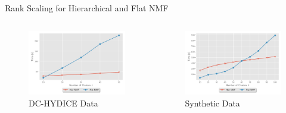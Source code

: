 \documentclass{beamer}
\newcommand{\hyper}{DC-HYDICE}
\begin{document}
\begin{frame}{Rank Scaling for Hierarchical and Flat NMF}
    \centering
    \begin{columns}
        \begin{column}{0.5\textwidth}
            \begin{figure}
            \includegraphics[width=\textwidth]{../plots/dc_rankscaling.pdf}
            \caption{\hyper{}  Data}
            \end{figure}
        \end{column}
        \begin{column}{0.5\textwidth}
            \begin{figure}
            \includegraphics[width=\textwidth]{../plots/synthetic_rankscaling.pdf}
            \caption{Synthetic Data}
            \end{figure}
        \end{column}
    \end{columns}
\end{frame}
\end{document}
